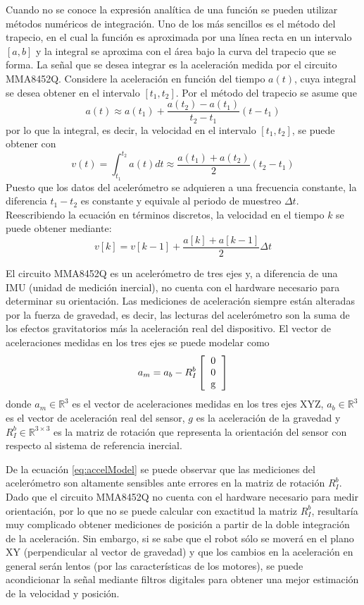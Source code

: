 \documentclass[letterpaper,12pt]{article}
\begin{document}
Cuando no se conoce la expresión analítica de una función se pueden utilizar métodos numéricos de integración. Uno de los más sencillos es el método del trapecio, en el cual la función es aproximada por una línea recta en un intervalo $[a,b]$ y la integral se aproxima con el área bajo la curva del trapecio que se forma. La señal que se desea integrar es la aceleración medida por el circuito MMA8452Q. Considere la aceleración en función del tiempo $a(t)$, cuya integral se desea obtener en el intervalo $[t_1,t_2]$. Por el método del trapecio se asume que
\[a(t) \approx  a(t_1) + \frac{a(t_2) - a(t_1)}{t_2 - t_1}(t - t_1)\]
por lo que la integral, es decir, la velocidad en el intervalo $[t_1,t_2]$, se puede obtener con
\[v(t) = \int_{t_1}^{t_2} a(t)dt \approx \frac{a(t_1) + a(t_2)}{2}(t_2 - t_1)\]
Puesto que los datos del acelerómetro se adquieren a una frecuencia constante, la diferencia $t_1 - t_2$ es constante y equivale al periodo de muestreo $\Delta t$. Reescribiendo la ecuación en términos discretos, la velocidad en el tiempo $k$ se puede obtener mediante:
\begin{equation}
v[k] = v[k-1] + \frac{a[k] + a[k-1]}{2}\Delta t
\label{eq:Integral}
\end{equation}

El circuito MMA8452Q es un acelerómetro de tres ejes y, a diferencia de una IMU (unidad de medición inercial), no cuenta con el hardware necesario para determinar su orientación. Las mediciones de aceleración siempre están alteradas por la fuerza de gravedad, es decir, las lecturas del acelerómetro son la suma de los efectos gravitatorios más la aceleración real del dispositivo. El vector de aceleraciones medidas en los tres ejes se puede modelar como
\begin{equation}
  \label{eq:accelModel}
  a_m = a_b - R_I^b \left[\begin{tabular}{c}0\\0\\g \end{tabular}\right]
\end{equation}
donde $a_m \in \mathbb{R}^3$ es el vector de aceleraciones medidas en los tres ejes XYZ, $a_b \in \mathbb{R}^3$ es el vector de aceleración real del sensor, $g$ es la aceleración de la gravedad y $R_I^b \in \mathbb{R}^{3\times 3}$ es la matriz de rotación que representa la orientación del sensor con respecto al sistema de referencia inercial. 

De la ecuación \ref{eq:accelModel} se puede observar que las mediciones del acelerómetro son altamente sensibles ante errores en la matriz de rotación $R_I^b$. Dado que el circuito MMA8452Q no cuenta con el hardware necesario para medir orientación, por lo que no se puede calcular con exactitud la matriz $R_I^b$, resultaría muy complicado obtener mediciones de posición a partir de la doble integración de la aceleración. Sin embargo, si se sabe que el robot sólo se moverá en el plano XY (perpendicular al vector de gravedad) y que los cambios en la aceleración en general serán lentos (por las características de los motores), se puede acondicionar la señal mediante filtros digitales para obtener una mejor estimación de la velocidad y posición. 
\end{document}
